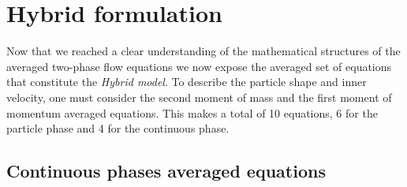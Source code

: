 \section{Hybrid formulation}
\label{sec:hybridchap2}


Now that we reached a clear understanding of the mathematical structures of the averaged two-phase flow equations we now expose the averaged set of equations that constitute the \textit{Hybrid model}. 
To describe the particle shape and inner velocity, one must consider the second moment of mass and the first moment of momentum averaged equations. 
This makes a total of 10 equations, 6 for the particle phase and 4 for the continuous phase.



\subsection{Continuous phases averaged equations}


